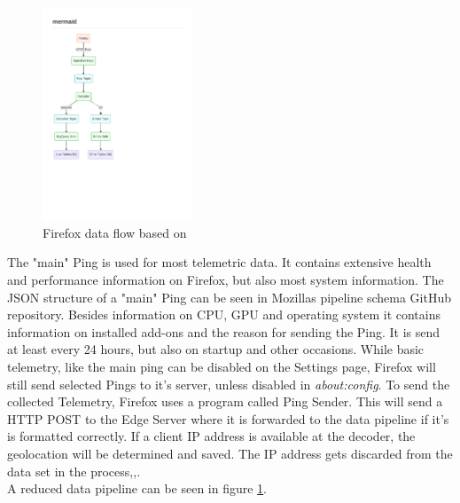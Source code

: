         \begin{figure}
            \centering
            \includegraphics[clip, trim=0.5cm 8cm 8cm 3.5cm, width=0.4\textwidth]{latex/figures/firefox_telemetry_graph}
            \caption[Firefox data flow]{Firefox data flow based on \cite{mozilla_overview_2020}}
            \label{fig:moz_data_flow}
        \end{figure}
        
        The "main" Ping is used for most telemetric data. It contains extensive health and performance information on Firefox, but also most system information. The JSON structure of a "main" Ping can be seen in Mozillas pipeline schema GitHub repository\cite{mozilla_mozilla-servicesmozilla-pipeline-schemas_2020}. 
        Besides information on CPU, GPU and operating system it contains information on installed add-ons and the reason for sending the Ping.
        It is send at least every 24 hours, but also on startup and other occasions. While basic telemetry, like the main ping can be disabled on the Settings page, Firefox will still send selected Pings to it's server, unless disabled in \textit{about:config}.
        To send the collected Telemetry, Firefox uses a program called Ping Sender.
        This will send a HTTP POST to the Edge Server where it is forwarded to the data pipeline if it's is formatted correctly.
        If a client IP address is available at the decoder, the geolocation will be determined and saved.
        The IP address gets discarded from the data set in the process\cite{mozilla_overview_2020},\cite{mozilla_http_2020},\cite{firefox_ping_nodate}.\\
        A reduced data pipeline can be seen in figure \ref{fig:moz_data_flow}.
        
